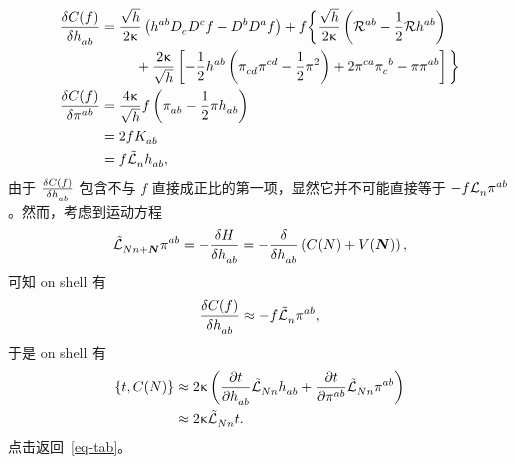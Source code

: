 \begin{Proof}
\begin{align*}
				\fdv{C(f)}{\tensor{h}{_a_b}} &= \frac{\sqrt{h}}{2\gkappa} \left( \tensor{h}{^a^b} \tensor{D}{_c} \tensor{D}{^c} f - \tensor{D}{^b} \tensor{D}{^a} f \right) + f \bigg\{ \frac{\sqrt{h}}{2\gkappa} \left( \tensor{\spacecurR}{^a^b} - \frac{1}{2} \spacecurR \tensor{h}{^a^b} \right)\\
				&\qquad \phantom{1} + \frac{2\gkappa}{\sqrt{h}} \left[ -\frac{1}{2} \tensor{h}{^a^b} \left( \tensor{\pi}{_c_d} \tensor{\pi}{^c^d} - \frac{1}{2} \pi^2 \right) + 2 \tensor{\pi}{^c^a} \tensor{\pi}{_c^b} - \pi \tensor{\pi}{^a^b} \right] \bigg\}\\
				\fdv{C(f)}{\tensor{\pi}{^a^b}} &= \frac{4\gkappa}{\sqrt{h}} f \left( \tensor{\pi}{_a_b} - \frac{1}{2} \pi \tensor{h}{_a_b} \right)\\
				&= 2 f \tensor{K}{_a_b}\\
				&= f \spaceLd{n} \tensor{h}{_a_b},
			\end{align*}
			由于 $\fdv{C(f)}{\tensor{h}{_a_b}}$ 包含不与 $f$ 直接成正比的第一项，显然它并不可能直接等于 $-f \Ld{n} \tensor{\pi}{^a^b}$。然而，考虑到运动方程
			\begin{equation*}
				\spaceLd{Nn+\myvec{N}} \tensor{\pi}{^a^b} = - \fdv{H}{\tensor{h}{_a_b}} = - \fdv{\tensor{h}{_a_b}} \left( C(N) + V(\myvec{N}) \right),
			\end{equation*}
			可知 on shell 有
			\begin{equation}
				\fdv{C(f)}{\tensor{h}{_a_b}} \approx -f \spaceLd{n} \tensor{\pi}{^a^b},
			\end{equation}
			于是 on shell 有
			\begin{equation}
				\begin{split}
					\left\{ t, C(N) \right\} &\approx 2 \gkappa \left( \pdv{t}{\tensor{h}{_a_b}} \spaceLd{Nn} \tensor{h}{_a_b} + \pdv{t}{\tensor{\pi}{^a^b}} \spaceLd{Nn} \tensor{\pi}{^a^b} \right)\\
					&\approx 2 \gkappa \spaceLd{Nn} t.
				\end{split}
			\end{equation}
			{\normalfont\ttfamily\color{green} 点击返回~\eqref{eq-tab}。}
		\end{Proof}
